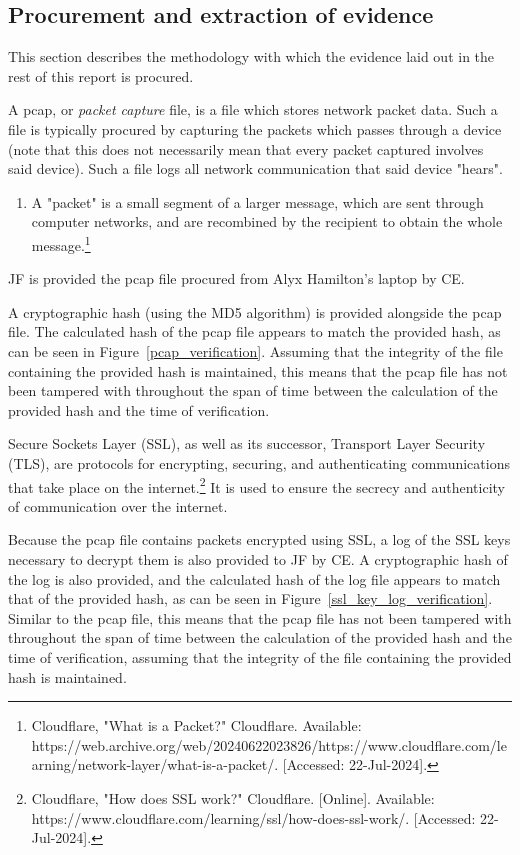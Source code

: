 \subsection{Procurement and extraction of evidence} %
\label{sub:Procurement and extraction of evidence}
\begin{myenum}
	\item This section describes the methodology with which the evidence laid out in the rest of this report is procured.
	\item A pcap, or \emph{packet capture} file, is a file which stores network packet data. Such a file is typically procured by capturing the packets which passes through a device (note that this does not necessarily mean that every packet captured involves said device). Such a file logs all network communication that said device "hears".
		\begin{enumerate}
			\item A "packet" is a small segment of a larger message, which are sent through computer networks, and are recombined by the recipient to obtain the whole message.\footnote{Cloudflare, "What is a Packet?" Cloudflare. Available: https://web.archive.org/web/20240622023826/https://www.cloudflare.com/learning/network-layer/what-is-a-packet/. [Accessed: 22-Jul-2024].}
		\end{enumerate}
	\item JF is provided the pcap file procured from Alyx Hamilton's laptop by CE. 
	\item A cryptographic hash (using the MD5 algorithm) is provided alongside the pcap file. The calculated hash of the pcap file appears to match the provided hash, as can be seen in Figure~\ref{pcap_verification}. Assuming that the integrity of the file containing the provided hash is maintained, this means that the pcap file has not been tampered with throughout the span of time between the calculation of the provided hash and the time of verification.
	\item Secure Sockets Layer (SSL), as well as its successor, Transport Layer Security (TLS), are protocols for encrypting, securing, and authenticating communications that take place on the internet.\footnote{Cloudflare, "How does SSL work?" Cloudflare. [Online]. Available: https://www.cloudflare.com/learning/ssl/how-does-ssl-work/. [Accessed: 22-Jul-2024].} It is used to ensure the secrecy and authenticity of communication over the internet.
	\item Because the pcap file contains packets encrypted using SSL, a log of the SSL keys necessary to decrypt them is also provided to JF by CE. A cryptographic hash of the log is also provided, and the calculated hash of the log file appears to match that of the provided hash, as can be seen in Figure~\ref{ssl_key_log_verification}. Similar to the pcap file, this means that the pcap file has not been tampered with throughout the span of time between the calculation of the provided hash and the time of verification, assuming that the integrity of the file containing the provided hash is maintained.

\end{myenum}
